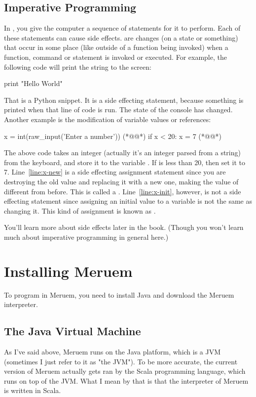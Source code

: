\subsection{Imperative Programming}
In , you give the computer a sequence of statements for it to perform. Each of these statements can cause side effects.  are changes (on a state or something) that occur in some place (like outside of a function being invoked) when a function, command or statement is invoked or executed. For example, the following code will print the string  to the screen:
\begin{Python}
	print "Hello World"
\end{Python}
That is a Python snippet. It is a side effecting statement, because something is printed when that line of code is run. The state of the console has changed. Another example is the modification of variable values or references: 
\begin{Python}
	x = int(raw_input('Enter a number')) (*@\label{line:x-init}@*)
	if x < 20:
		x = 7 (*@\label{line:x-new}@*)
\end{Python}
The above code takes an integer (actually it's an integer parsed from a string) from the keyboard, and store it to the variable . If  is less than 20, then set it to 7. Line~\ref{line:x-new} is a side effecting assignment statement since you are destroying the old value and replacing it with a new one, making the value of  different from before. This is called a . Line~\ref{line:x-init}, however, is not a side effecting statement since assigning an initial value to a variable is not the same as changing it. This kind of assignment is known as .

You'll learn more about side effects later in the book. (Though you won't learn much about imperative programming in general here.)

\section{Installing Meruem}
To program in Meruem, you need to install Java and download the Meruem interpreter.

\subsection{The Java Virtual Machine}
As I've said above, Meruem runs on the Java platform, which is a JVM (sometimes I just refer to it as "the JVM"). To be more accurate, the current version of Meruem actually gets ran by the Scala programming language, which runs on top of the JVM. What I mean by that is that the interpreter of Meruem is written in Scala. 

